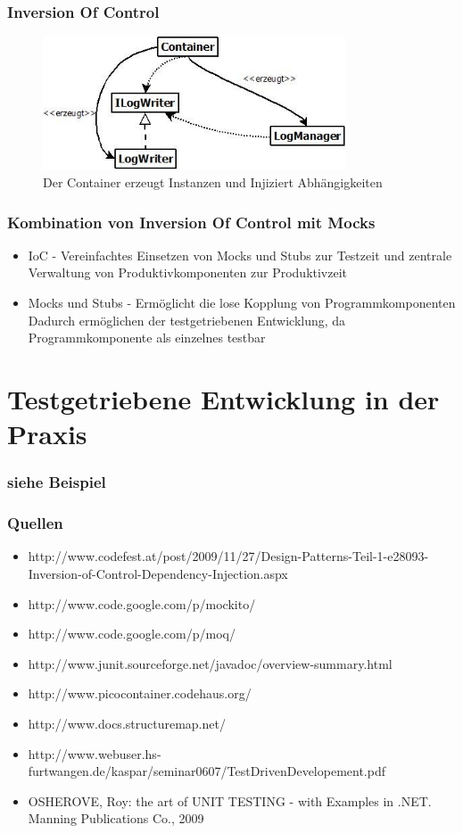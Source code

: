 \documentclass{beamer}
\begin{document}
\begin{frame}
\frametitle{Inversion Of Control}
\begin{figure}[htbp]
\includegraphics[width=9cm]{logging_looseCoupled.jpg}
\caption{Der Container erzeugt Instanzen und Injiziert Abhängigkeiten}
\end{figure}
\end{frame}

\begin{frame}
\frametitle{Kombination von Inversion Of Control mit Mocks}
\begin{itemize}
\item IoC - Vereinfachtes Einsetzen von Mocks und Stubs zur Testzeit und zentrale Verwaltung von Produktivkomponenten zur Produktivzeit
\item Mocks und Stubs - Ermöglicht die lose Kopplung von Programmkomponenten\\
Dadurch ermöglichen der testgetriebenen Entwicklung, da Programmkomponente als einzelnes testbar\\
\end{itemize}
\end{frame}

\section{Testgetriebene Entwicklung in der Praxis}
\begin{frame}
\frametitle{siehe Beispiel}
\end{frame}

\begin{appendix}
\begin{frame}
\frametitle{Quellen}
\begin{itemize}
\item http://www.codefest.at/post/2009/11/27/Design-Patterns-Teil-1-e28093-Inversion-of-Control-Dependency-Injection.aspx
\item http://www.code.google.com/p/mockito/
\item http://www.code.google.com/p/moq/
\item http://www.junit.sourceforge.net/javadoc/overview-summary.html
\item http://www.picocontainer.codehaus.org/
\item http://www.docs.structuremap.net/
\item http://www.webuser.hs-furtwangen.de/kaspar/seminar0607/TestDrivenDevelopement.pdf
\item OSHEROVE, Roy: the art of UNIT TESTING - with Examples in .NET. Manning Publications Co., 2009
\end{itemize}
\end{frame}
\end{appendix}
\end{document}
